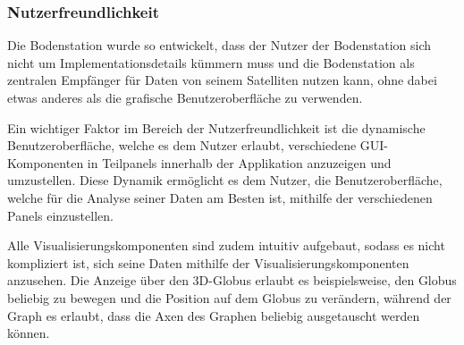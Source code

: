 \subsubsection{Nutzerfreundlichkeit}
Die Bodenstation wurde so entwickelt, dass der Nutzer der Bodenstation sich nicht um Implementationsdetails kümmern muss und die Bodenstation als zentralen Empfänger für Daten von seinem Satelliten nutzen kann, ohne dabei etwas anderes als die grafische Benutzeroberfläche zu verwenden. 

Ein wichtiger Faktor im Bereich der Nutzerfreundlichkeit ist die dynamische Benutzeroberfläche, welche es dem Nutzer erlaubt, verschiedene GUI-Komponenten in Teilpanels innerhalb der Applikation anzuzeigen und umzustellen. Diese Dynamik ermöglicht es dem Nutzer, die Benutzeroberfläche, welche für die Analyse seiner Daten am Besten ist, mithilfe der verschiedenen Panels einzustellen.

Alle Visualisierungskomponenten sind zudem intuitiv aufgebaut, sodass es nicht kompliziert ist, sich seine Daten mithilfe der Visualisierungskomponenten anzusehen. Die Anzeige über den 3D-Globus erlaubt es beispielsweise, den Globus beliebig zu bewegen und die Position auf dem Globus zu verändern, während der Graph es erlaubt, dass die Axen des Graphen beliebig ausgetauscht werden können.

